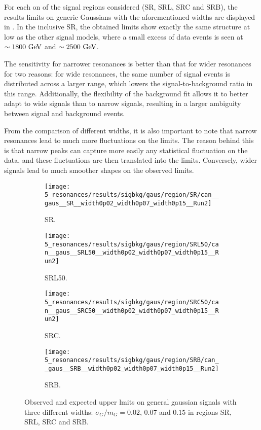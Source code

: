 For each on of the signal regions considered (SR, SRL, SRC and SRB), the results limits on generic Gaussians with the aforementioned widths are displayed in \Fig{\ref{fig:results:results:bkgsig:results:gaus:limits}}.
In the inclusive SR, the obtained limits show exactly the same structure at low \myj as the other signal models, where a small excess of data events is seen at \(\sim 1800~\text{GeV}\) and \(\sim 2500~\text{GeV}\).

The sensitivity for narrower resonances is better than that for wider resonances for two reasons: for wide resonances, the same number of signal events is distributed across a larger \myj range, which lowers the signal-to-background ratio in this range. Additionally, the flexibility of the background fit allows it to better adapt to wide signals than to narrow signals, resulting in a larger ambiguity between signal and background events.

From the comparison of different widths, it is also important to note that narrow resonances lead to much more fluctuations on the limits. The reason behind this is that narrow peaks can capture more easily any statistical fluctuation on the data, and these fluctuations are then translated into the limits. Conversely, wider signals lead to much smoother shapes on the observed limits.

\begin{figure}[ht!]
    \centering
    \begin{subfigure}[h]{0.49\linewidth}
        \centering
        \texttt{[image: 5\_resonances/results/sigbkg/gaus/region/SR/can\_\_gaus\_\_SR\_\_width0p02\_width0p07\_width0p15\_\_Run2]}
        \caption{SR.}
    \end{subfigure}
    \begin{subfigure}[h]{0.49\linewidth}
        \centering
        \texttt{[image: 5\_resonances/results/sigbkg/gaus/region/SRL50/can\_\_gaus\_\_SRL50\_\_width0p02\_width0p07\_width0p15\_\_Run2]}
        \caption{SRL50.}
    \end{subfigure}
    \begin{subfigure}[h]{0.49\linewidth}
        \centering
        \texttt{[image: 5\_resonances/results/sigbkg/gaus/region/SRC50/can\_\_gaus\_\_SRC50\_\_width0p02\_width0p07\_width0p15\_\_Run2]}
        \caption{SRC.}
    \end{subfigure}
    \begin{subfigure}[h]{0.49\linewidth}
        \centering
        \texttt{[image: 5\_resonances/results/sigbkg/gaus/region/SRB/can\_\_gaus\_\_SRB\_\_width0p02\_width0p07\_width0p15\_\_Run2]}
        \caption{SRB.}
    \end{subfigure}
    \caption{Observed and expected upper lmits on general gaussian signals with three different widths: \(\sigma_G/m_G = 0.02, \, 0.07\) and \(0.15\) in regions SR, SRL, SRC and SRB.}
    \label{fig:results:results:bkgsig:results:gaus:limits}
\end{figure}

